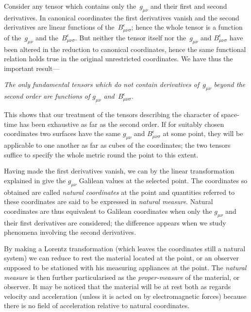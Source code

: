 \documentclass[12pt]{book}
\begin{document}
Consider any tensor which contains only the~$g_{\mu\nu}$ and their first and second
derivatives. In canonical coordinates the first derivatives vanish and the
second derivatives are linear functions of the~$B_{\mu\nu\sigma}^{\epsilon}$; hence the whole tensor is
a function of the~$g_{\mu\nu}$ and the~$B_{\mu\nu\sigma}^{\epsilon}$. But neither the tensor itself nor the~$g_{\mu\nu}$
and $B_{\mu\nu\sigma}^{\epsilon}$ have been altered in the reduction to canonical coordinates, hence
the same functional relation holds true in the original unrestricted coordinates.
We have thus the important result---

\emph{The only fundamental tensors which do not contain derivatives of~$g_{\mu\nu}$ beyond
the second order are functions of $g_{\mu\nu}$ and~$B_{\mu\nu\sigma}^{\epsilon}$.}

This shows that our treatment of the tensors describing the character of
space-time has been exhaustive as far as the second order. If for suitably
chosen coordinates two surfaces have the same $g_{\mu\nu}$ and $B_{\mu\nu\sigma}^{\epsilon}$ at some point,
they will be applicable to one another as far as cubes of the coordinates; the
two tensors suffice to specify the whole metric round the point to this extent.

Having made the first derivatives vanish, we can by the linear transformation
explained in  give the $g_{\mu\nu}$ Galilean values at the selected point.
The coordinates so obtained are called \emph{natural coordinates} at the point and
%
%
quantities referred to these coordinates are said to be expressed in \emph{natural
measure}. Natural coordinates are thus equivalent to Galilean coordinates
when only the $g_{\mu\nu}$ and their first derivatives are considered; the difference
appears when we study phenomena involving the second derivatives.

By making a Lorentz transformation (which leaves the coordinates still
a natural system) we can reduce to rest the material located at the point, or
an observer supposed to be stationed with his measuring appliances at the
point. The \emph{natural measure} is then further particularised as the \emph{proper\hyp{}measure}
of the material, or observer. It may be noticed that the material
will be at rest both as regards velocity and acceleration (unless it is acted on
by electromagnetic forces) because there is no field of acceleration relative to
natural coordinates.
\end{document}
